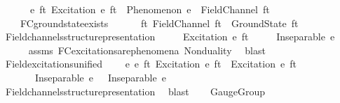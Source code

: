 \begin{isabellebody}
\ \ \ \ \ \ {\isachardoublequoteopen}{\isasymforall}e\ ft{\isachardot}{\kern0pt}\ Excitation\ e\ ft\ {\isasymlongrightarrow}\ Phenomenon\ e\ {\isasymand}\ FieldChannel\ ft{\isachardoublequoteclose}\ \isanewline
\ \ \ \ FC{}{\isacharunderscore}{\kern0pt}ground{\isacharunderscore}{\kern0pt}state{\isacharunderscore}{\kern0pt}exists{\isacharcolon}{\kern0pt}\isanewline
\ \ \ \ \ \ {\isachardoublequoteopen}{\isasymforall}ft{\isachardot}{\kern0pt}\ FieldChannel\ ft\ {\isasymlongrightarrow}\ GroundState\ ft{\isachardoublequoteclose}\isanewline
\isanewline
\ \ \isamarkupfalse%
\ Field{\isacharunderscore}{\kern0pt}channels{\isacharunderscore}{\kern0pt}structure{\isacharunderscore}{\kern0pt}presentation{\isacharcolon}{\kern0pt}\isanewline
\ \ \ \ \ {\isachardoublequoteopen}Excitation\ e\ ft{\isachardoublequoteclose}\isanewline
\ \ \ \ \ {\isachardoublequoteopen}Inseparable\ e\ {\isasymOmega}{\isachardoublequoteclose}\isanewline
%
\isadelimproof
\ \ \ \ %
\endisadelimproof
%
\isatagproof
{}\isamarkupfalse%
\ assms\ FC{}{\isacharunderscore}{\kern0pt}excitations{\isacharunderscore}{\kern0pt}are{\isacharunderscore}{\kern0pt}phenomena\ Nonduality\ \isamarkupfalse%
\ blast%
\endisatagproof
{\isafoldproof}%
%
\isadelimproof
\isanewline
%
\endisadelimproof
\isanewline
\ \ \isamarkupfalse%
\ Field{\isacharunderscore}{\kern0pt}excitations{\isacharunderscore}{\kern0pt}unified{\isacharcolon}{\kern0pt}\isanewline
\ \ \ \ {\isachardoublequoteopen}{\isasymforall}e{}\ e{}\ ft{\isachardot}{\kern0pt}\ Excitation\ e{}\ ft\ {\isasymand}\ Excitation\ e{}\ ft\ {\isasymlongrightarrow}\isanewline
\ \ \ \ \ \ \ Inseparable\ e{}\ {\isasymOmega}\ {\isasymand}\ Inseparable\ e{}\ {\isasymOmega}{\isachardoublequoteclose}\isanewline
%
\isadelimproof
\ \ \ \ %
\endisadelimproof
%
\isatagproof
{}\isamarkupfalse%
\ Field{\isacharunderscore}{\kern0pt}channels{\isacharunderscore}{\kern0pt}structure{\isacharunderscore}{\kern0pt}presentation\ \isamarkupfalse%
\ blast%
\endisatagproof
{\isafoldproof}%
%
\isadelimproof
%
\endisadelimproof
%
\isadelimdocument
%
\endisadelimdocument
%
\isatagdocument
%
\isamarkuptrue%
%
\endisatagdocument
{\isafolddocument}%
%
\isadelimdocument
%
\endisadelimdocument
\ \ \isamarkupfalse%
\ GaugeGroup\ \ \isanewline
\isanewline

\end{isabellebody}
